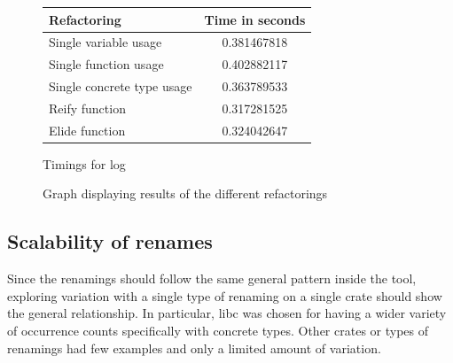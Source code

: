 \begin{figure}[H]
\begin{center}
    \begin{tabular}{ | l | c |}
    \hline
    \textbf{Refactoring} & \textbf{Time in seconds} \\ \hline
    Single variable usage &  0.381467818  \\ \hline
    Single function usage &   0.402882117  \\ \hline
    Single concrete type usage  &  0.363789533 \\ \hline
    Reify function &   0.317281525 \\ \hline
    Elide function &  0.324042647 \\ \hline
    \end{tabular}
\end{center}

\caption{Timings for log}
\label{Fig:log}
\end{figure}

\begin{figure}[H]
\begin{center}
\caption{Graph displaying results of the different refactorings}
\label{Fig:compareref}
\end{center}
\end{figure}

\subsection{Scalability of renames}
Since the renamings should follow the same general pattern inside the tool, exploring variation with a single type of renaming on a single crate should show the general relationship. In particular, libc was chosen for having a wider variety of occurrence counts specifically with concrete types. Other crates or types of renamings had few examples and only a limited amount of variation.

